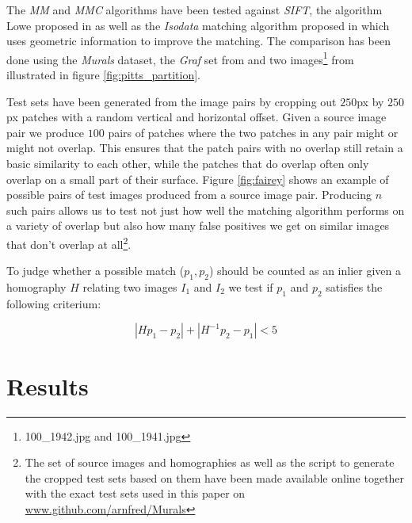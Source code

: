 \documentclass[12pt,journal]{IEEEtran}
\begin{document}
%
The \emph{MM} and \emph{MMC} algorithms have been tested against 
\emph{SIFT}, the algorithm Lowe proposed in \cite{lowe2004sift} as well 
as the \emph{Isodata} matching algorithm proposed in \cite{das2008event} 
which uses geometric information to improve the matching. The comparison 
has been done using the \emph{Murals} dataset, the \emph{Graf} set from 
\cite{mikolajczyk2005performance} and two images\footnote{100\_1942.jpg 
and 100\_1941.jpg} from \cite{gallagher2008} illustrated in figure 
\ref{fig:pitts_partition}.

Test sets have been generated from the image pairs by cropping out 
$250$px by $250$px patches with a random vertical and horizontal offset.  
Given a source image pair we produce $100$ pairs of patches where the 
two patches in any pair might or might not overlap.  This ensures that 
the patch pairs with no overlap still retain a basic similarity to each 
other, while the patches that do overlap often only overlap on a small 
part of their surface. Figure \ref{fig:fairey} shows an example of 
possible pairs of test images produced from a source image pair.  
Producing $n$ such pairs allows us to test not just how well the 
matching algorithm performs on a variety of overlap but also how many 
false positives we get on similar images that don't overlap at 
all\footnote{The set of source images and homographies as well as the 
	script to generate the cropped test sets based on them have been 
made available online together with the exact test sets used in this 
paper on 
\href{https://github.com/arnfred/Murals}{www.github.com/arnfred/Murals}}.

To judge whether a possible match ($p_1, p_2$) should be counted as an 
inlier given a homography $H$ relating two images $I_1$ and $I_2$ we 
test if $p_1$ and $p_2$ satisfies the following criterium:

$$\left\vert Hp_1 - p_2 \right\vert + \left\vert H^{-1}p_2 - p_1 
\right\vert < 5$$
%
\section{Results}
\label{results}
\end{document}
